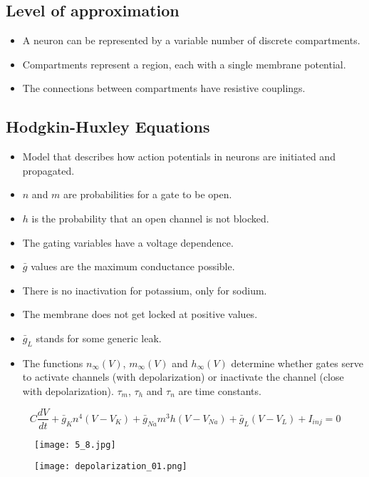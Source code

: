 \documentclass[main]{subfiles}
\begin{document}
\subsection{Level of approximation}
\begin{itemize}[noitemsep,nolistsep]
	\item A neuron can be represented by a variable number of discrete compartments.
	\item Compartments represent a region, each with a single membrane potential.
	\item The connections between compartments have resistive couplings.
\end{itemize}

\subsection{Hodgkin-Huxley Equations}
\begin{itemize}[noitemsep,nolistsep]
	\item Model that describes how action potentials in neurons are initiated and propagated.
	\item $n$ and $m$ are probabilities for a gate to be open.
	\item $h$ is the probability that an open channel is not blocked.
	\item The gating variables have a voltage dependence.
	\item $\bar{g}$ values are the maximum conductance possible.
	\item There is no inactivation for potassium, only for sodium.
	\item The membrane does not get locked at positive values.
	\item $\bar{g}_L$ stands for some generic leak.
	\item The functions $n_\infty(V)$, $m_\infty(V)$ and $h_\infty(V)$ determine whether gates serve to activate channels (with depolarization) or inactivate the channel (close with depolarization). $\tau_m$, $\tau_h$ and $\tau_n$ are time constants.
\end{itemize}
\[C\frac{dV}{dt}+\bar{g}_Kn^4(V-V_K)+\bar{g}_{Na}m^3h(V-V_{Na})+\bar{g}_L(V-V_L)+I_{inj}=0\]

\begin{figure}[H]
	\centering
	\texttt{[image: 5\_8.jpg]}
\end{figure} 
\begin{figure}[H]
	\centering
	\texttt{[image: depolarization\_01.png]}
\end{figure} 
\end{document}
